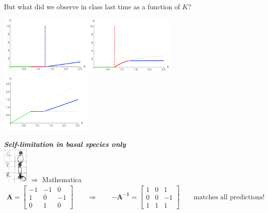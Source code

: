 \documentclass{article}
\newcommand{\note}[1]{\colorbox{gray!30}{#1}}
\newcommand{\ind}{\-\hspace{1cm}}
\begin{document}
But what did we observe in class last time as a function of $K$?
\begin{center}
\includegraphics[width=4.5cm]{figs/TC_R.png}\ind \includegraphics[width=4.5cm]{figs/TC_C.png}\ind \includegraphics[width=4.5cm]{figs/TC_P.png}
\end{center}
\emph{\textbf{Self-limitation in basal species only}}\\
\ind \includegraphics[width=1.25cm]{figs/TC_basal.pdf}
 \note{$\Rightarrow$ Mathematica}
\begin{align*}
	\mathbf{A}=\begin{bmatrix} -1 & -1 & 0 \\ 1 & 0 & -1 \\ 0 & 1 & 0 \end{bmatrix} \qquad \Rightarrow \qquad \mathbf{-A^{-1}}=\begin{bmatrix} 1 & 0 & 1 \\ 0 & 0 & -1 \\ 1 & 1 & 1 \end{bmatrix} \qquad \text{matches all predictions!}
\end{align*}
\end{document}
